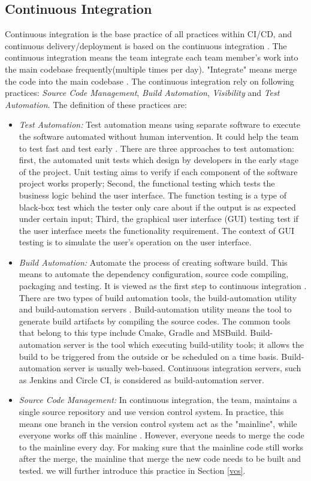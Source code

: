 \subsection{Continuous Integration}
Continuous integration is the base practice of all practices within CI/CD, and continuous delivery/deployment is based on the continuous integration \cite{pittet2018continuous}.
The continuous integration means the team integrate each team member's work into the main codebase frequently(multiple times per day). "Integrate" means merge the code into the main codebase \cite{fowler2006continuous}. The continuous integration rely on following practices: \textit{Source Code Management}, \textit{Build Automation}, \textit{Visibility} and \textit{Test Automation}. The definition of these practices are:
\begin{itemize}
    \label{TestA}
    \item \textit{Test Automation:} Test automation means using separate software to execute the software automated without human intervention. It could help the team to test fast and test early \cite{Testauto48:online}. There are three approaches to test automation: first, the automated unit tests which design by developers in the early stage of the project. Unit testing aims to verify if each component of the software project works properly; Second, the functional testing which tests the business logic behind the user interface. The function testing is a type of black-box test which the tester only care about if the output is as expected under certain input; Third, the graphical user interface (GUI) testing test if the user interface meets the functionality requirement. The context of GUI testing is to simulate the user's operation on the user interface.
    \item \textit{Build Automation:} Automate the process of creating software build. This means to automate the dependency configuration, source code compiling, packaging and testing. It is viewed as the first step to continuous integration \cite{Buildaut62:online}. There are two types of build automation tools, the build-automation utility and build-automation servers \cite{ceruzzi2003history}. Build-automation utility means the tool to generate build artifacts by compiling the source codes. The common tools that belong to this type include Cmake, Gradle and MSBuild. Build-automation server is the tool which executing build-utility tools; it allows the build to be triggered from the outside or be scheduled on a time basis. Build-automation server is usually web-based. Continuous integration servers, such as Jenkins and Circle CI, is considered as build-automation server. 
    \item \textit{Source Code Management:} In continuous integration, the team, maintains a single source repository and use version control system. In practice, this means one branch in the version control system act as the "mainline", while everyone works off this mainline \cite{fowler2006continuous}. However, everyone needs to merge the code to the mainline every day. For making sure that the mainline code still works after the merge, the mainline that merge the new code needs to be built and tested. we will further introduce this practice in Section \ref{vcs}. 
\end{itemize}
